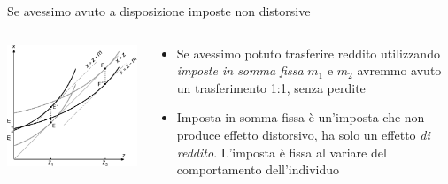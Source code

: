 \documentclass[aspectratio=64,11pt]{beamer}
\begin{document}
\begin{frame}{Se avessimo avuto a disposizione imposte non distorsive}
\begin{columns}
\begin{column}{.55\columnwidth}
\begin{center}
\includegraphics[width=\textwidth]{./figure/effetto-distorsivo-imposte-ql-5.pdf}
\end{center}
\end{column}

\begin{column}{.45\columnwidth}
\begin{itemize}
\item Se avessimo potuto trasferire reddito utilizzando \emph{imposte in somma fissa} $m_1$ e $m_2$ avremmo avuto un trasferimento 1:1, senza perdite
\item Imposta in somma fissa è un'imposta che non produce effetto distorsivo, ha solo un effetto \emph{di reddito}. L'imposta è fissa al variare del comportamento dell'individuo
\end{itemize}
\end{column}
\end{columns}
\end{frame}
\end{document}
